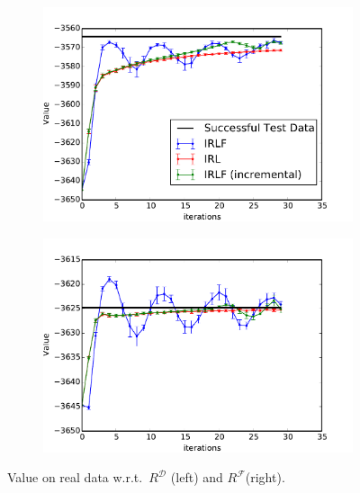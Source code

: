 \documentclass[letterpaper]{article}
\begin{document}
\begin{figure}[t]
  \begin{subfigure}[b]{0.495\columnwidth}
    \includegraphics[trim=0.5cm 0.5cm 0.2cm 0.2,clip=true,width=\textwidth]{images/expert_apprentice_real.pdf}
    \label{fig:real_expert_apprentice}
  \end{subfigure}
  \begin{subfigure}[b]{0.495\columnwidth}
    \includegraphics[trim=0.5cm 0.5cm 0.2cm 0.2,clip=true,width=\textwidth]{images/taboo_apprentice_real.pdf}
    \label{fig:real_taboo_apprentice}
  \end{subfigure}  
  \vspace{-8mm}
  \caption{Value on real data w.r.t.\ $R^\mathcal{D}$ (left) and $R^\mathcal{F}$(right).}
  \vspace{-4mm}
  \label{fig:real_data}
\end{figure}
\end{document}
